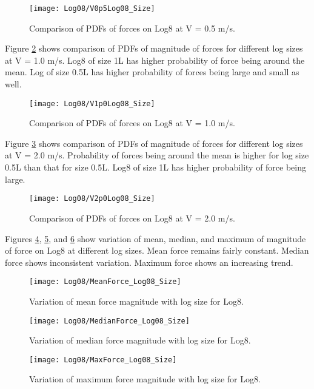 \begin{figure}
\centering
\texttt{[image: Log08/V0p5Log08\_Size]}
\caption{\label{fig:V0p5Log08_Size}Comparison of PDFs of forces on Log8 at V = 0.5 m/s.}
\end{figure}

\noindent Figure \ref{fig:V1p0Log08_Size} shows comparison of PDFs of magnitude of forces for different log sizes at V = 1.0 m/s. Log8 of size 1L has higher probability of force being around the mean. Log of size 0.5L has higher probability of forces being large and small as well.

\begin{figure}
\centering
\texttt{[image: Log08/V1p0Log08\_Size]}
\caption{\label{fig:V1p0Log08_Size}Comparison of PDFs of forces on Log8 at V = 1.0 m/s.}
\end{figure}

\noindent Figure \ref{fig:V2p0Log08_Size} shows comparison of PDFs of magnitude of forces for different log sizes at V = 2.0 m/s. Probability of forces being around the mean is higher for log size 0.5L than that for size 0.5L. Log8 of size 1L has higher probability of force being large.  

\begin{figure}
\centering
\texttt{[image: Log08/V2p0Log08\_Size]}
\caption{\label{fig:V2p0Log08_Size}Comparison of PDFs of forces on Log8 at V = 2.0 m/s.}
\end{figure}

\noindent Figures \ref{fig:MeanForce_Log08_Size}, \ref{fig:MedianForce_Log08_Size}, and \ref{fig:MaxForce_Log08_Size} show variation of mean, median, and maximum of magnitude of force on Log8 at different log sizes. Mean force remains fairly constant. Median force shows inconsistent variation. Maximum force shows an increasing trend. 

\begin{figure}
\centering
\texttt{[image: Log08/MeanForce\_Log08\_Size]}
\caption{\label{fig:MeanForce_Log08_Size}Variation of mean force magnitude with log size for Log8.}
\end{figure}
\begin{figure}
\centering
\texttt{[image: Log08/MedianForce\_Log08\_Size]}
\caption{\label{fig:MedianForce_Log08_Size}Variation of median force magnitude with log size for Log8.}
\end{figure}
\begin{figure}
\centering
\texttt{[image: Log08/MaxForce\_Log08\_Size]}
\caption{\label{fig:MaxForce_Log08_Size}Variation of maximum force magnitude with log size for Log8.}
\end{figure}

